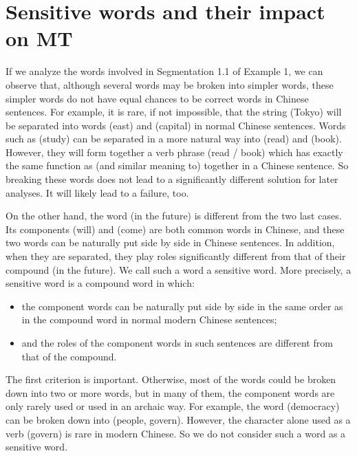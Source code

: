 \section{Sensitive words and their impact on MT}

If we analyze the words involved in Segmentation 1.1 of Example 1, we can observe that, although several words may 
be broken into simpler words, these simpler words do not have equal chances to be correct words in Chinese sentences. 
For example, it is rare, if not impossible, that the string  (Tokyo) will be separated into words   (east) and  
(capital) in normal Chinese sentences. Words such as  (study) can be separated in a more natural way into   (read) 
and   (book). However, they will form together a verb phrase  (read / book) which has exactly the same function 
as (and similar meaning to)  together in a Chinese sentence. So 
breaking these words does not lead to a significantly different solution for later analyses.
It will likely lead to a failure, too.

On the other hand, the word   (in the future) is different from the two last cases. Its components   (will) and   (come) are both 
common words in Chinese, and these two words can be naturally put side by side in Chinese sentences. In addition, 
when they are separated, they play roles significantly different from that of their compound  (in the future). We call such a word 
a sensitive word. More precisely, a sensitive word is a compound word in which:

\begin{itemize}
\item the component words can be naturally put side by side in the same order as in the compound word in normal 
modern Chinese sentences;

\item and the roles of the component words in such sentences are different from that of the compound.
\end{itemize}

The first criterion is important. Otherwise, most of the words could be broken down into two or more words, 
but in many of them, the component words are only rarely used or used in an archaic way. For example, the word  
(democracy) can be broken down into  (people, govern). However, the character   alone used as a verb 
(govern) is rare in modern Chinese. So we do not consider such a word as a sensitive word.

